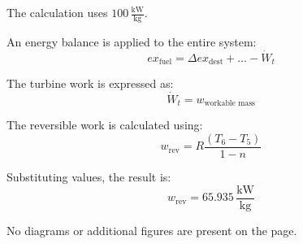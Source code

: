 The calculation uses \( 100 \, \frac{\text{kW}}{\text{kg}} \).  

An energy balance is applied to the entire system:  
\[
ex_{\text{fuel}} = \Delta ex_{\text{dest}} + \dots - \dot{W}_t
\]  

The turbine work is expressed as:  
\[
\dot{W}_t = w_{\text{workable mass}}
\]  

The reversible work is calculated using:  
\[
w_{\text{rev}} = R \frac{(T_6 - T_5)}{1 - n}
\]  

Substituting values, the result is:  
\[
w_{\text{rev}} = 65.935 \, \frac{\text{kW}}{\text{kg}}
\]  

No diagrams or additional figures are present on the page.